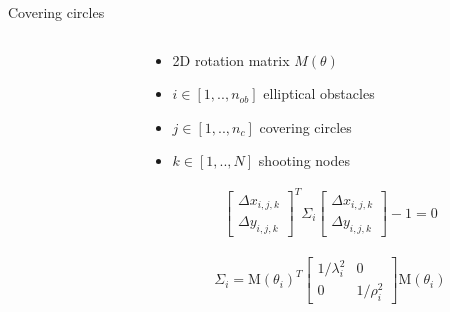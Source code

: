 \documentclass[10pt,aspectratio=1610]{beamer} %
\begin{document}
\begin{frame}{Covering circles}
	\begin{columns}[onlytextwidth]
		\begin{column}{0.45\textwidth}
			\begin{center}
			\def\svgwidth{1.1\textwidth}
			
			\end{center}
		\end{column}

		\begin{column}{0.45\textwidth}
		\begin{itemize}[label=\textbullet]
			\item 2D rotation matrix $M(\theta)$
			\item ${i} \in [1, .., n_{ob}]$ elliptical obstacles
			\item ${j} \in [1, .., n_{c}]$ covering circles
			\item ${k} \in [1, .., N]$ shooting nodes
		\end{itemize}
		\begin{align*}
			\begin{bmatrix}
				\Delta x_{i, j, k}\\
				\Delta y_{i, j, k}
			\end{bmatrix}^T
			\Sigma_{i}
			\begin{bmatrix}
				\Delta x_{i, j, k}\\
				\Delta y_{i, j, k}
			\end{bmatrix} - 1 = 0
		\end{align*}
	
		\begin{align*}\Sigma_{i} =
			\mathrm{M}(\theta_{i})^T
				\begin{bmatrix}
					1/\lambda^{2}_{i} & 0\\
					0 & 1/\rho^{2}_{i}
				\end{bmatrix}
				\mathrm{M}(\theta_{i})
		\end{align*}
		\end{column}
	\end{columns}
\end{frame}
\end{document}
